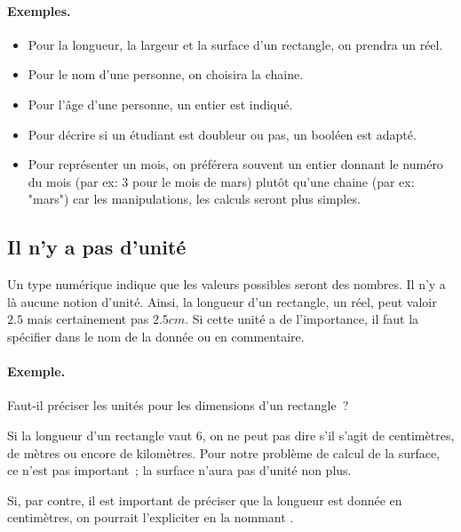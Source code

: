 		\begin{Emphase}
			\paragraph{Exemples.}	
			\begin{itemize}
			\item Pour la longueur, la largeur et la surface d’un rectangle, on prendra un réel.
			\item Pour le nom d’une personne, on choisira la chaine.
			\item Pour l’âge d’une personne, un entier est indiqué.
			\item Pour décrire si un étudiant est doubleur ou pas, un booléen est adapté.
			\item Pour représenter un mois, on préférera souvent un entier
				donnant le numéro du mois (par ex: 3 pour le mois de mars)
				plutôt qu’une chaine (par ex: "mars")
				car les manipulations, les calculs seront plus simples.
			\end{itemize}
		\end{Emphase}
	
		\subsection{Il n’y a pas d’unité}
	
			Un type numérique indique que les valeurs possibles seront
			des nombres. Il n’y a là aucune notion d’unité.
			Ainsi, la longueur d’un rectangle, un réel, 
			peut valoir $2.5$ mais certainement pas $2.5 cm$.
			Si cette unité a de l’importance,
			il faut la spécifier dans le nom de la donnée ou en commentaire.
			
			\begin{Emphase}
				\paragraph{Exemple.}
				Faut-il préciser les unités 
				pour les dimensions d’un rectangle~?
				
				Si la longueur d’un rectangle vaut $6$, 
				on ne peut pas dire s’il s’agit de centimètres, 
				de mètres ou encore de kilomètres.
				Pour notre problème de calcul de la surface,
				ce n’est pas important~;
				la surface n’aura pas d’unité non plus.
				
				Si, par contre, 
				il est important de préciser que la longueur
				est donnée en centimètres,
				on pourrait l’expliciter en la nommant
				.	
			\end{Emphase}
	
